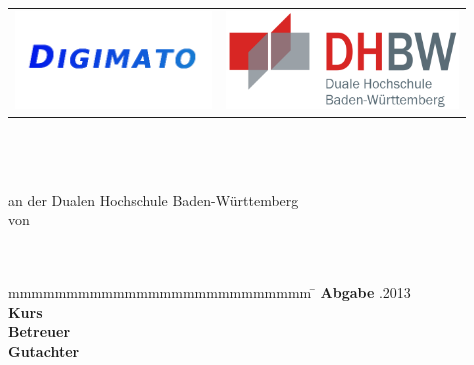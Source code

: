 \begin{titlepage}
	\begin{longtable}{p{} p{}}
	  {\includegraphics[height=2.6cm]{images/logo.png}} & 
	  {\includegraphics[height=2.6cm]{images/dhbw.png}}
	\end{longtable}
	\enlargethispage{25mm}
	\begin{center}
	  \vspace*{18mm}	{\LARGE\bf \titel }\\
	  \vspace*{18mm}	{\large\bf \arbeit}\\
	  \vspace*{18mm}	\studiengang\\
	  \vspace*{3mm} 	an der Dualen Hochschule Baden-Württemberg \dhbw\\
	  \vspace*{18mm}	von\\
	  \vspace*{3mm} 	{\large\bf \autor}\\
	  \vspace*{18mm}	\datumAbgabe\\
	\end{center}
	\vfill
	\begin{spacing}{1.2}
	\begin{tabbing}
		mmmmmmmmmmmmmmmmmmmmmmmmmm     \= \kill
		\textbf{Abgabe}  .2013\\
		\textbf{Kurs}  				   \>  \kurs\\
		\textbf{Betreuer}              \>  \betreuer\\
		\textbf{Gutachter}             \>  \gutachter
	\end{tabbing}
	\end{spacing}
\end{titlepage}
